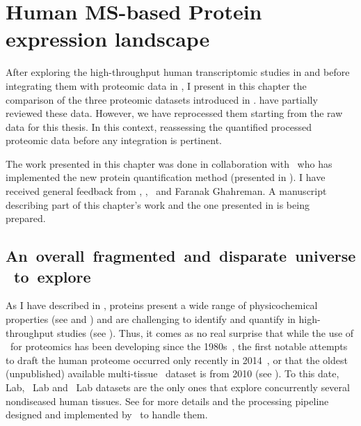 \chapter{Human MS-based Protein expression landscape}\label{ch:proteomics}

\setlength{\epigraphwidth}{0.7\textwidth}
    \setlength{\epigraphrule}{0pt}

After exploring the high-throughput human transcriptomic studies
in 
and before integrating them with proteomic data in ,
I present in this chapter the comparison of
the three proteomic datasets introduced in .
\citet{Ezkurdia2014-qx,Deutsch2015} have partially reviewed these data.
However, we have reprocessed them starting from the raw data
for this thesis.
In this context, reassessing the quantified processed proteomic data
before any integration is pertinent.\mybr\

The work presented in this chapter was done in collaboration with \james\
who has implemented the new protein quantification method
(presented in ).
I have received general feedback from \alvis, \mar,
\sarah\ and Faranak Ghahreman.
A manuscript describing part of this chapter's work
and the one presented in  is being prepared.\mybr\

\section{An~overall~fragmented~and~disparate~universe~to~explore}

As I have described in ,
proteins present a wide range of physicochemical properties
(see  and )
and are challenging to identify and quantify
in high-throughput studies (see ).
Thus, it comes as no real surprise that
while the use of \ms\ for proteomics has been developing since the 1980s~,
the first notable attempts to draft the human proteome occurred only recently
in 2014~\mycite{PandeyData,KusterData},
or that the oldest (unpublished) available multi-tissue \cutler\ dataset is from 2010
(see \Cref{subsec:cutler}).
To this date,
\cutler Lab, \kuster\ Lab and \pandey\ Lab datasets are the only ones
that explore concurrently several nondiseased human tissues.
See  for more details and
the processing pipeline designed and implemented by \james\ to handle them.\mybr\

